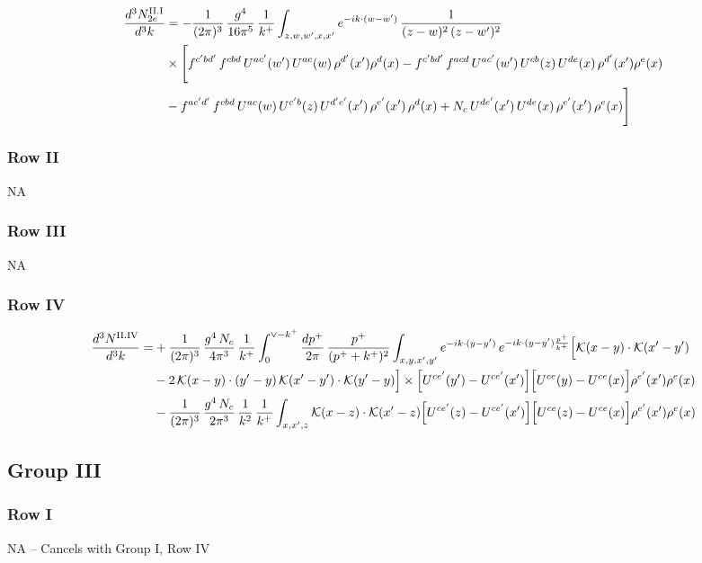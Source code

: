 \documentclass[9pt]{article}
\numberwithin{equation}{section}
\begin{document}
\begin{align}
\frac{d^{3}N^{\rm II.I}_{2e}}{d^{3}k}&= -\frac{1}{(2\pi)^{3}}\,\frac{g^{4}}{16\pi^{5}}\,\frac{1}{k^{+}}\int_{z,w,w^{\prime},x,x^{\prime}}e^{-ik\cdot{(w-w^{\prime})}}\,\frac{1}{(z-w)^{2}\,(z-w^{\prime})^{2}}\notag\\
&\times\Bigg[f^{c^{\prime}bd^{\prime}}\,f^{cbd}\, U^{ac^{\prime}}(w^{\prime})\,U^{ac}(w)\,\rho^{d^{\prime}}(x^{\prime})\rho^{d}(x)- f^{c^{\prime}bd^{\prime}}\,f^{acd}\,U^{ac^{\prime}}(w^{\prime})\,U^{cb}(z)\,U^{de}(x)\,\rho^{d^{\prime}}(x^{\prime})\rho^{e}(x) \notag \\ & -f^{ac^{\prime}d^{\prime}}\,f^{cbd}\,U^{ac}(w)\,U^{c^{\prime}b}(z)\,U^{d^{\prime}e^{\prime}}(x^{\prime})\,\rho^{e^{\prime}}(x^{\prime})\,\rho^{d}(x) +N_{c}\,U^{de^{\prime}}(x^{\prime})\,U^{de}(x)\,\rho^{e^{\prime}}(x^{\prime})\,\rho^{e}(x)\Bigg]\notag
\end{align}
\subsubsection*{Row II}
\textsc{NA}
\subsubsection*{Row III}
\textsc{NA}
\subsubsection*{Row IV}
\begin{align}
\frac{d^{3}N^{\rm II.IV}}{d^{3}k}= &  +\frac{1}{(2\pi)^{3}}\,\frac{g^{4}\,N_{c}}{4\pi^{3}}\,\frac{1}{k^{+}}\int_{0}^{\vee-k^{+}}\frac{dp^{+}}{2\pi}\,\frac{p^{+}}{(p^{+}+k^{+})^{2}}\int_{x,y,x',y'}e^{-ik\cdot{(y-y')}}\,e^{-ik\cdot{(y-y')}\frac{p^{+}}{k^{+}}}\Big[\mathcal{K}(x-y)\cdot\mathcal{K}(x'-y')\notag \\ & -2\,\mathcal{K}(x-y)\cdot(y'-y)\,\mathcal{K}(x'-y')\cdot\mathcal{K}(y'-y)\Big]\times\Big[U^{ce'}(y') - U^{ce'}(x')\Big]\Big[U^{ce}(y) - U^{ce}(x)\Big]\rho^{e'}(x')\rho^{e}(x)\notag \\ & -\frac{1}{(2\pi)^{3}}\,\frac{g^{4}\,N_{c}}{2\pi^{3}}\,\frac{1}{k^{2}}\,\frac{1}{k^{+}}\int_{x,x',z}\mathcal{K}(x-z)\cdot\mathcal{K}(x'-z)\Big[U^{ce'}(z)-U^{ce'}(x')\Big]\Big[U^{ce}(z)-U^{ce}(x)\Big]\rho^{e'}(x')\rho^{e}(x)
\label{eq:D-II.IVrem}
\end{align}
\subsection{Group III}
\subsubsection*{Row I}
\textsc{NA} -- Cancels with Group I, Row IV
\end{document}
